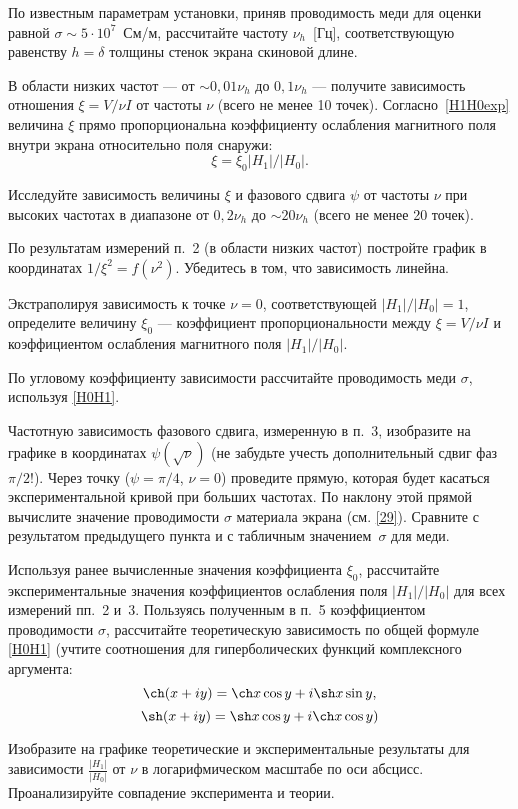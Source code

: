 \begin{lab:task}
\item По известным параметрам установки, приняв проводимость меди
для оценки равной $\sigma \sim 5\cdot 10^{7}$~См/м, рассчитайте частоту
$\nu_h$~[Гц], соответствующую равенству $h=\delta$ толщины стенок экрана
скиновой длине.

\item В области низких частот --- от  $\sim 0,01\nu_h$ до $0,1\nu_{h}$ --- получите зависимость отношения $\xi = V/\nu I$ от
частоты $\nu$ (всего не менее 10 точек). Согласно~\eqref{H1H0exp} величина $\xi$ прямо
пропорциональна коэффициенту ослабления магнитного поля внутри
экрана относительно поля снаружи:
\[\xi=\xi_0 |H_1|/|H_0|.\]

\item Исследуйте зависимость величины $\xi$
и фазового сдвига $\psi$ от частоты $\nu$ при высоких частотах
в диапазоне от $0,2\nu_h$ до $\sim 20\nu_h$
(всего не менее 20 точек).


\item По результатам измерений п.~2 (в области низких частот)
постройте график в координатах $1/\xi^2=f(\nu^2)$.
Убедитесь в том, что зависимость линейна.

Экстраполируя зависимость к точке $\nu=0$, соответствующей
$|H_1|/|H_0|=1$, определите величину $\xi_0$ --- коэффициент
пропорциональности между $\xi=V/\nu I$ и коэффициентом ослабления магнитного поля
$|H_1|/|H_0|$.

По угловому коэффициенту зависимости рассчитайте проводимость меди $\sigma$,
используя \eqref{H0H1}.

\item Частотную зависимость фазового сдвига,
измеренную в п.~3, изобразите на графике в координатах
$\psi(\sqrt{\nu})$ (не забудьте учесть дополнительный сдвиг фаз $\pi/2$!).
Через точку ($\psi=\pi/4$, $\nu=0$) проведите прямую,
которая будет касаться экспериментальной кривой при больших частотах.
По наклону этой прямой вычислите значение проводимости $\sigma$ материала экрана
(см. \eqref{29}).
Сравните с результатом предыдущего пункта и с табличным значением~$\sigma$ для меди.

\item Используя ранее вычисленные значения коэффициента $\xi_0$,
рассчитайте экспериментальные значения коэффициентов
ослабления поля $|H_1|/|H_0|$ для всех измерений пп.~2 и~3.
Пользуясь полученным в п.~5 коэффициентом проводимости $\sigma$,
рассчитайте теоретическую зависимость по общей формуле \eqref{H0H1}
(учтите соотношения для гиперболических функций комплексного аргумента:
\[\ch(x+iy) = \ch x \cos y + i \sh x \sin y,
\]
\[\sh(x+iy) = \sh x \cos y + i \ch x \cos y)
\]

Изобразите на графике теоретические и экспериментальные
результаты для зависимости $\frac{|H_1|}{|H_0|}$ от $\nu$
в логарифмическом масштабе по оси абсцисс.
Проанализируйте совпадение эксперимента и теории.


\end{lab:task}


